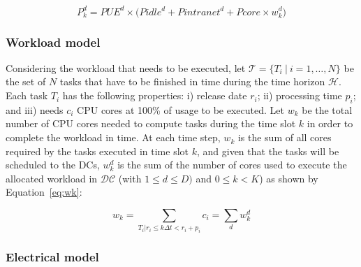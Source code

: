 \begin{equation} \label{eq:power_cons}
   P^d_k  = PUE^d \times \big( Pidle^d + Pintranet^d + Pcore \times w^d_k\big)
\end{equation}



\subsubsection{Workload model}
\label{sec:workload_model_ccgrid}
Considering the workload that needs to be executed, let $\mathcal{T} = \{T_i \ | \ i=1, \ldots, N\}$ be the set of $N$ tasks that have to be finished in time during the time horizon $\mathcal{H}$. Each task $T_i$ has the following properties: i) release date $r_i$; ii)  processing time $p_i$;  and iii) needs $c_i$ CPU cores at 100\% of usage to be executed. Let $w_k$ be the total number of CPU cores needed to compute tasks during the time slot $k$ in order to complete the workload in time. At each time step, $w_k$ is the sum of all cores required by the tasks executed in time slot $k$, and given that the tasks will be scheduled to the DCs,  $w_k^d$ is the sum of the number of cores used to execute the allocated workload in $\mathcal{DC}$ (with $1\leq d\leq D)$ and $0\leq k<K$) as shown by Equation~\eqref{eq:wk}:

\begin{equation} \label{eq:wk}
    w_k = \sum_{T_i|r_i\leq k\Delta t<r_i+p_i} c_i = \sum_d w_k^d
\end{equation}


\subsubsection{Electrical model}
\label{sec:electrical_model_ccgrid}



